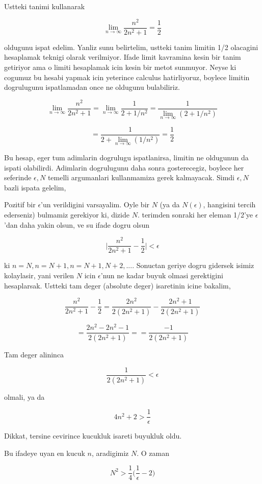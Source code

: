 \documentclass[12pt,fleqn]{article}
\begin{document}
Ustteki tanimi kullanarak 

\[ \lim_{n \to \infty } \frac{n^2}{2n^2 + 1} = \frac{1}{2} \]

oldugunu ispat edelim. Yanliz sunu belirtelim, ustteki tanim limitin 1/2
olacagini hesaplamak teknigi olarak verilmiyor. Ifade limit kavramina kesin
bir tanim getiriyor ama o limiti hesaplamak icin kesin bir metot
sunmuyor. Neyse ki cogumuz bu hesabi yapmak icin yeterince calculus
hatirliyoruz, boylece limitin dogrulugunu ispatlamadan once ne oldugunu
bulabiliriz.

\[ \lim_{n \to \infty } \frac{n^2}{2n^2 + 1}  =
\lim_{n \to \infty } \frac{1}{2 + 1/n^2} =
\frac{1}{\lim_{n \to \infty }(2 + 1/n^2)} 
\]

\[ = \frac{1}{2 + \lim_{n \to \infty }(1/n^2)}  = \frac{1}{2} \]

Bu hesap, eger tum adimlarin dogrulugu ispatlanirsa, limitin ne oldugunun
da ispati olabilirdi. Adimlarin dogrulugunu daha sonra gosterecegiz,
boylece her seferinde $\epsilon,N$ temelli argumanlari kullanmamiza gerek
kalmayacak. Simdi  $\epsilon,N$ bazli ispata gelelim, 

Pozitif bir $\epsilon$'un verildigini varsayalim. Oyle bir $N$ (ya da
$N(\epsilon)$, hangisini tercih ederseniz) bulmamiz gerekiyor ki, dizide
$N$. terimden sonraki her eleman 1/2'ye $\epsilon$'dan daha yakin olsun, ve
su ifade dogru olsun

\[ 
\bigg|\frac{n^2}{2n^2+1} - \frac{1}{2}\bigg| < \epsilon
 \]

ki $n=N,n=N+1,n=N+1,N+2,...$. Sonuctan geriye dogru gidersek isimiz
kolaylasir, yani verilen $N$ icin $\epsilon$'nun ne kadar buyuk olmasi
gerektigini hesaplarsak. Ustteki tam deger (absolute deger) isaretinin 
icine bakalim, 

\[ 
\frac{n^2}{2n^2+1}  - \frac{1}{2} = 
\frac{2n^2}{2(2n^2+1)}  - \frac{2n^2+1}{2(2n^2+1)} 
 \]

\[  
= \frac{2n^2 - 2n^2 - 1}{2(2n^2+1)} = 
= \frac{- 1}{2(2n^2+1)} 
\]

Tam deger alininca 

\[  \frac{1}{2(2n^2+1)} < \epsilon\]

olmali, ya da

\[ 4n^2 + 2 > \frac{1}{\epsilon} \]

Dikkat, tersine cevirince kucukluk isareti buyukluk oldu. 

Bu ifadeye uyan en kucuk $n$, aradigimiz $N$. O zaman 

\[ N^2 > \frac{1}{4}\bigg(\frac{1}{\epsilon} - 2\bigg) \]
\end{document}
